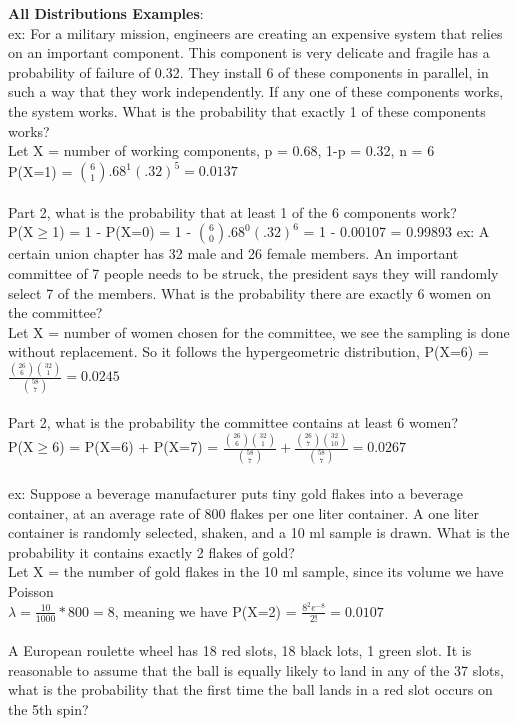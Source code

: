 \documentclass[12pt, a4paper]{article}
\begin{document}
	\noindent \textbf{All Distributions Examples}: \\
	ex: For a military mission, engineers are creating an expensive system that relies on an important component. This component is very delicate and fragile has a probability of failure of 0.32. They install 6 of these components in parallel, in such a way that they work independently. If any one of these components works, the system works. What is the probability that exactly 1 of these components works? \\
	Let X = number of working components, p = 0.68, 1-p = 0.32, n = 6 \\
	P(X=1) = $\binom{6}{1}.68^1(.32)^5 = 0.0137$ \\~\\
	Part 2, what is the probability that at least 1 of the 6 components work? \\
	P(X$\geq$1) = 1 - P(X=0) = 1 - $\binom{6}{0}.68^0(.32)^6$ = 1 - 0.00107 = 0.99893 \newpage
	\noindent ex: A certain union chapter has 32 male and 26 female members. An important committee of 7 people needs to be struck, the president says they will randomly select 7 of the members. What is the probability there are exactly 6 women on the committee? \\
	Let X = number of women chosen for the committee, we see the sampling is done without replacement. 
	So it follows the hypergeometric distribution, P(X=6) = $\frac{\binom{26}{6}\binom{32}{1}}{\binom{58}{7}} = 0.0245$ \\~\\
	Part 2, what is the probability the committee contains at least 6 women? \\
	P(X$\geq$6) = P(X=6) + P(X=7) = $\frac{\binom{26}{6}\binom{32}{1}}{\binom{58}{7}} + \frac{\binom{26}{7}\binom{32}{10}}{\binom{58}{7}} = 0.0267$ \\~\\
	ex: Suppose a beverage manufacturer puts tiny gold flakes into a beverage container, at an average rate of 800 flakes per one liter container. A one liter container is randomly selected, shaken, and a 10 ml sample is drawn. What is the probability it contains exactly 2 flakes of gold? \\
	Let X = the number of gold flakes in the 10 ml sample, since its volume we have Poisson \\
	$\lambda = \frac{10}{1000}*800 = 8$, meaning we have P(X=2) = $\frac{8^2e^{-8}}{2!} = 0.0107$ \\~\\	
	\noindent A European roulette wheel has 18 red slots, 18 black lots, 1 green slot. It is reasonable to assume that the ball is equally likely to land in any of the 37 slots, what is the probability that the first time the ball lands in a red slot occurs on the 5th spin? \\
\end{document}
